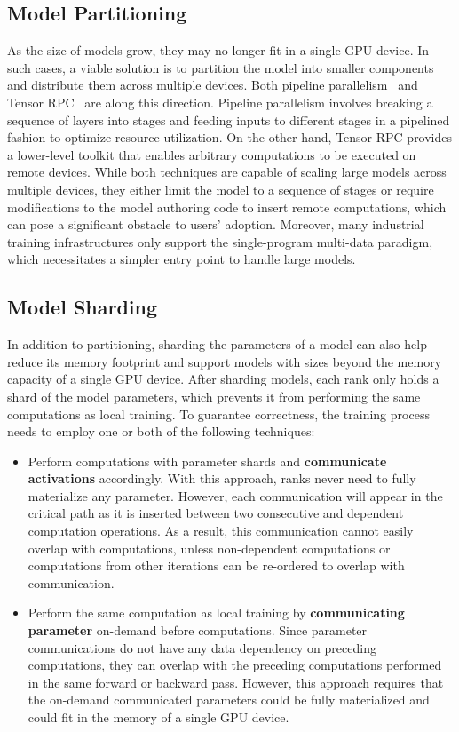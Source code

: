 \subsection{Model Partitioning}

As the size of models grow, they may no longer fit in a single GPU device. In such cases, a viable solution is to partition the model into smaller components and distribute them across multiple devices. Both pipeline parallelism~\cite{gpipe} and Tensor RPC~\cite{rpc} are along this direction. Pipeline parallelism involves breaking a sequence of layers into stages and feeding inputs to different stages in a pipelined fashion to optimize resource utilization. On the other hand, Tensor RPC provides a lower-level toolkit that enables arbitrary computations to be executed on remote devices. While both techniques are capable of scaling large models across multiple devices, they either limit the model to a sequence of stages or require modifications to the model authoring code to insert remote computations, which can pose a significant obstacle to users' adoption. Moreover, many industrial training infrastructures only support the single-program multi-data paradigm, which necessitates a simpler entry point to handle large models.


\subsection{Model Sharding}

In addition to partitioning, sharding the parameters of a model can also help reduce its memory footprint and support models with sizes beyond the memory capacity of a single GPU device. After sharding models, each rank only holds a shard of the model parameters, which prevents it from performing the same computations as local training. To guarantee correctness, the training process needs to employ one or both of the following techniques:

\begin{itemize}
    \item Perform computations with parameter shards and \textbf{communicate activations} accordingly. With this approach, ranks never need to fully materialize any parameter. However, each communication will appear in the critical path as it is inserted between two consecutive and dependent computation operations. As a result, this communication cannot easily overlap with computations, unless non-dependent computations or computations from other iterations can be re-ordered to overlap with communication.
    \item Perform the same computation as local training by \textbf{communicating parameter} on-demand before computations. Since parameter communications do not have any data dependency on preceding computations, they can overlap with the preceding computations performed in the same forward or backward pass. However, this approach requires that the on-demand communicated parameters could be fully materialized and could fit in the memory of a single GPU device.
\end{itemize}

